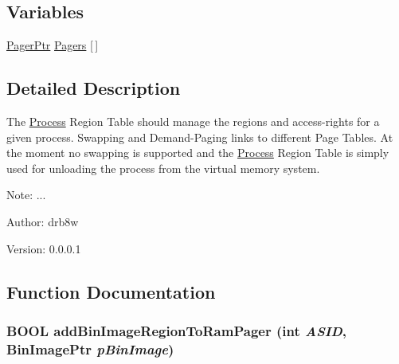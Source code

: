 \subsection*{Variables}
\begin{CompactItemize}
\item 
\hyperlink{struct_pager}{PagerPtr} \hyperlink{group___v_m_m___p_r_t_gd51c26b7297e20a13f290d1a9063efa5}{Pagers} \mbox{[}$\,$\mbox{]}
\end{CompactItemize}


\subsection{Detailed Description}
The \hyperlink{struct_process}{Process} Region Table should manage the regions and access-rights for a given process. Swapping and Demand-Paging links to different Page Tables. At the moment no swapping is supported and the \hyperlink{struct_process}{Process} Region Table is simply used for unloading the process from the virtual memory system. 

\begin{Desc}
\item[Note:]... \end{Desc}
\begin{Desc}
\item[Author:]drb8w \end{Desc}
\begin{Desc}
\item[Version:]0.0.0.1 \end{Desc}


\subsection{Function Documentation}
\hypertarget{group___v_m_m___p_r_t_g9a1a7531051937bcea7f8f373cd5e622}{
\subsubsection[{addBinImageRegionToRamPager}]{\setlength{\rightskip}{0pt plus 5cm}BOOL addBinImageRegionToRamPager (int {\em ASID}, \/  BinImagePtr {\em pBinImage})}}
\label{group___v_m_m___p_r_t_g9a1a7531051937bcea7f8f373cd5e622}


